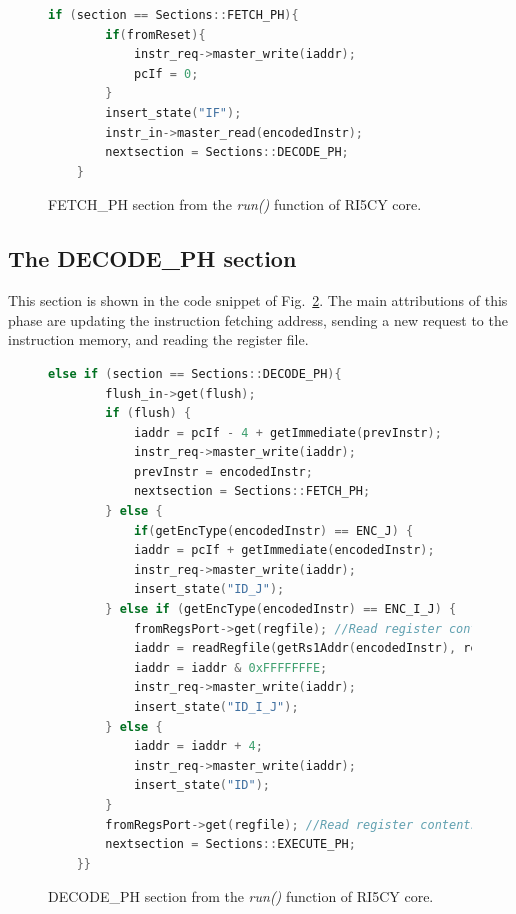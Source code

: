 \begin{figure}[htb!]
    \begin{lstlisting}[language=c++]
    if (section == Sections::FETCH_PH){
        if(fromReset){
            instr_req->master_write(iaddr);
            pcIf = 0;
        }
        insert_state("IF");
        instr_in->master_read(encodedInstr);
        nextsection = Sections::DECODE_PH;
    }\end{lstlisting}
    \caption{FETCH\_PH section from the \textit{run()} function of RI5CY core.}
    \label{fig:ri5cy-fetch-ph}
\end{figure}

\subsection*{The DECODE\_PH section}

This section is shown in the code snippet of Fig.~\ref{fig:ri5cy-decode-ph}. The main attributions of this phase are updating the instruction fetching address, sending a new request to the instruction memory, and reading the register file. 

\begin{figure}[htb!]
    \begin{lstlisting}[language=c++]
    else if (section == Sections::DECODE_PH){
        flush_in->get(flush);
        if (flush) {
            iaddr = pcIf - 4 + getImmediate(prevInstr);
            instr_req->master_write(iaddr);
            prevInstr = encodedInstr;
            nextsection = Sections::FETCH_PH;
        } else {
            if(getEncType(encodedInstr) == ENC_J) {
            iaddr = pcIf + getImmediate(encodedInstr);
            instr_req->master_write(iaddr);
            insert_state("ID_J");
        } else if (getEncType(encodedInstr) == ENC_I_J) {
            fromRegsPort->get(regfile); //Read register contents
            iaddr = readRegfile(getRs1Addr(encodedInstr), regfile) + getImmediate(encodedInstr);
            iaddr = iaddr & 0xFFFFFFFE;
            instr_req->master_write(iaddr);
            insert_state("ID_I_J");
        } else {
            iaddr = iaddr + 4;
            instr_req->master_write(iaddr);
            insert_state("ID");
        }
        fromRegsPort->get(regfile); //Read register contents
        nextsection = Sections::EXECUTE_PH;
    }}\end{lstlisting}
    \caption{DECODE\_PH section from the \textit{run()} function of RI5CY core.}
    \label{fig:ri5cy-decode-ph}
\end{figure}

